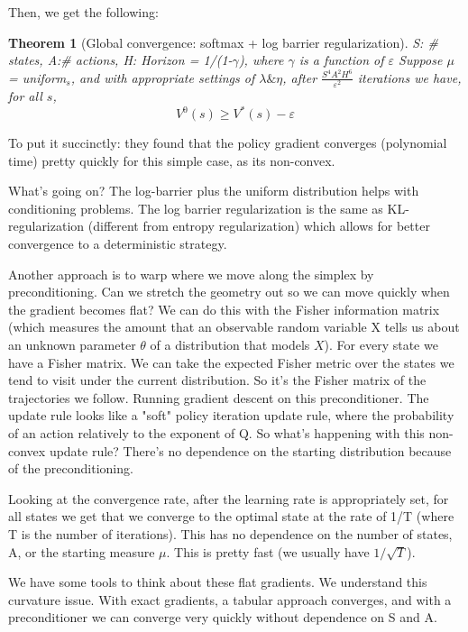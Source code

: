 \documentclass[12pt,reqno]{amsart}
\newtheorem{theorem}{Theorem}[section]
\newcommand\eps{\varepsilon}
\begin{document}
Then, we get the following:
\begin{shaded}
\begin{theorem}[Global convergence: softmax + log barrier regularization]
S: \# states, A:\# actions, H: Horizon = 1/(1-$\gamma$), where $\gamma$ is a function of $\eps$
Suppose $\mu$ = uniform$_{s}$, and with appropriate settings of $\lambda \& \eta$, after $\frac{S^4 A^2 H^6}{\eps^2}$ iterations we have, for all $s$,
\begin{equation}
V^0(s) \geq V^*(s) -\eps
\end{equation}
\end{theorem}
\end{shaded}

To put it succinctly: they found that the policy gradient converges (polynomial time) pretty quickly for this simple case, as its non-convex.

What's going on? The log-barrier plus the uniform distribution helps with conditioning problems. The log barrier regularization is the same as KL-regularization (different from entropy regularization) which allows for better convergence to a deterministic strategy.

Another approach is to warp where we move along the simplex by preconditioning. Can we stretch the geometry out so we can move quickly when the gradient becomes flat?
        We can do this with the Fisher information matrix (which measures the amount that an observable random variable X tells us about an unknown parameter $\theta$ of a distribution that models $X$).
        For every state we have a Fisher matrix. We can take the expected Fisher metric over the states we tend to visit under the current distribution. So it's the Fisher matrix of the trajectories we follow. Running gradient descent on this preconditioner.
        The update rule looks like a "soft" policy iteration update rule, where the probability of an action relatively to the exponent of Q. So what's happening with this non-convex update rule? There's no dependence on the starting distribution because of the preconditioning.

Looking at the convergence rate, after the learning rate is appropriately set, for all states we get that we converge to the optimal state at the rate of 1/T (where T is the number of iterations). This has no dependence on the number of states, A, or the starting measure $\mu$. This is pretty fast (we usually have $1/\sqrt{T}$).

We have some tools to think about these flat gradients. We understand this curvature issue. With exact gradients, a tabular approach converges, and with a preconditioner we can converge very quickly without dependence on S and A.
\end{document}
